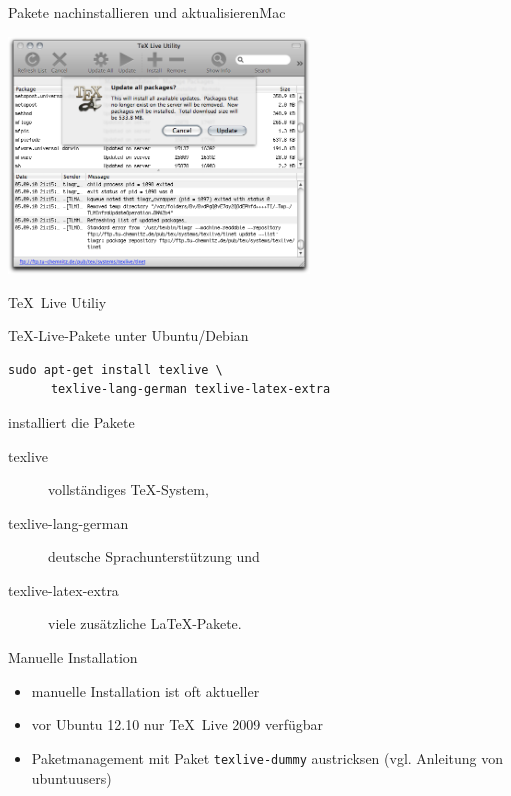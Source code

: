 \begin{Frame}{Pakete nachinstallieren und aktualisieren}{Mac}
  \begin{minipage}{\textwidth}\begin{center}
    \includegraphics[width=8cm]{images/mactex-update}

    \TeX\ Live Utiliy
  \end{center}\end{minipage}
\end{Frame}


\begin{Frame}[fragile]{\TeX-Live-Pakete unter Ubuntu/Debian}
  \begin{lstlisting}[gobble=4,language={},morekeywords={sudo,apt,get}]
    sudo apt-get install texlive \
      texlive-lang-german texlive-latex-extra
  \end{lstlisting}

  installiert die Pakete

  \begin{description}
    \item[texlive] vollständiges \TeX-System, 
    \item[texlive-lang-german] deutsche Sprachunterstützung und
    \item[texlive-latex-extra] viele zusätzliche \LaTeX-Pakete.
  \end{description}

  \begin{alertblock}{Manuelle Installation}
    \begin{itemize}
      \item manuelle Installation ist oft aktueller
      \item vor Ubuntu 12.10 nur \TeX\ Live 2009 verfügbar
      \item Paketmanagement mit Paket \texttt{texlive-dummy} austricksen
        (vgl. Anleitung von ubuntuusers)
    \end{itemize}
  \end{alertblock}
\end{Frame}

